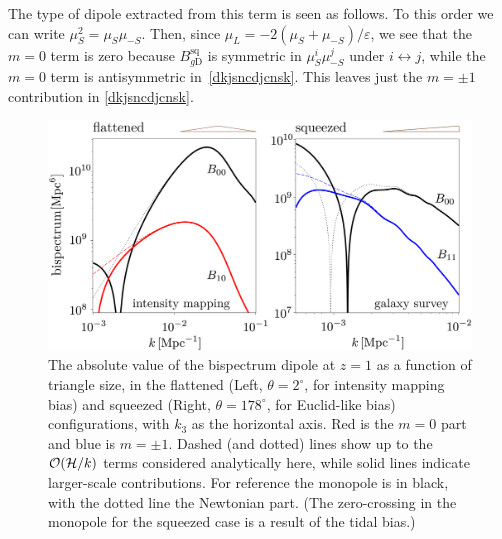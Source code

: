 The type of dipole extracted from this term is seen as follows. To this order we can write $\mu_{S}^2=\mu_{S}\mu_{-S}$. Then,  since $\mu_L=-2(\mu_S+\mu_{-S})/
\varepsilon$, we see that the $m=0$ term is zero because $B_{g {\mathrm{D}}}^{\mathrm{sq}}$ is symmetric in $\mu_{S}^i\mu_{-S}^j$ under $i\leftrightarrow j$, while the $m=0$ term is antisymmetric in~\eqref{dkjsncdjcnsk}. This leaves just the $m=\pm1$ contribution in \eqref{dkjsncdjcnsk}.




\begin{figure}%
\begin{center}
\includegraphics[width=\columnwidth]{fig/figuresv2-02}
\caption{ The absolute value of the bispectrum dipole at $z=1$  as a function of triangle size, in the flattened (Left, $\theta=2^\circ$, for intensity mapping bias) and squeezed (Right, $\theta=178^\circ$, for Euclid-like bias) configurations, with $k_3$ as the horizontal axis. Red is the $m=0$ part and blue is $m=\pm1$. Dashed (and dotted) lines show up to the $\mathcal{O}(\mathcal{H}/k)$ terms considered analytically here, while solid lines indicate larger-scale contributions. For reference the monopole is in black, with the dotted line the Newtonian part.  (The zero-crossing in the monopole for the squeezed case is a result of the tidal bias.)}
\label{snakcjnsdlkcans}
\end{center}
\end{figure}

